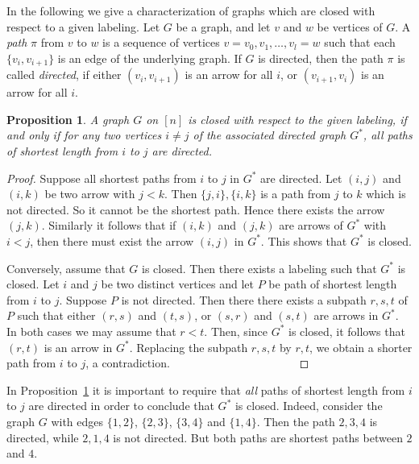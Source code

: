 \documentclass[11pt]{amsart}
\newtheorem{Proposition}[Theorem]{Proposition}
\begin{document}
In the following we give a characterization of graphs which are closed with respect to a given labeling. Let $G$ be a graph, and let $v$ and $w$ be vertices of $G$. A {\em path} $\pi$ from $v$ to $w$ is a sequence of vertices $v=v_0,v_1,\ldots,v_l=w$ such that each $\{v_i,v_{i+1}\}$ is an edge of the underlying graph. If $G$ is directed, then the path $\pi$ is called {\em directed}, if either $(v_i,v_{i+1})$ is an arrow for all $i$, or $(v_{i+1},v_i)$ is an arrow for all $i$.

\begin{Proposition}
\label{characterization}
A graph $G$  on $[n]$ is closed with respect to the given labeling, if and only if  for any two vertices $i\neq j$ of the associated directed graph $G^*$, all paths of shortest length  from $i$ to $j$ are directed.
\end{Proposition}

\begin{proof}
Suppose all shortest paths from $i$ to $j$ in $G^*$ are directed. Let $(i,j)$ and $(i,k)$ be two arrow with $j<k$.  Then $\{j,i\},\{i,k\}$ is a path from $j$ to $k$ which is not directed. So it cannot be the shortest path. Hence there exists the arrow $(j,k)$. Similarly it follows that if $(i,k)$  and $(j,k)$  are arrows of $G^*$ with $i<j$, then there must exist the arrow $(i,j)$ in $G^*$. This shows that $G^*$ is closed.

Conversely, assume that $G$ is closed.  Then there exists a labeling such that $G^*$ is closed. Let $i$ and $j$ be two distinct vertices and let $P$ be path of shortest length from $i$ to $j$. Suppose $P$ is not directed. Then there there exists a subpath $r,s,t$ of $P$  such that  either $(r,s)$ and  $(t,s)$,  or  $(s,r)$ and  $(s,t)$ are arrows in $G^*$. In both cases we may assume that $r<t$. Then, since $G^*$ is closed, it follows that $(r,t)$  is an arrow in $G^*$. Replacing the subpath $r,s,t$   by $r,t$,  we obtain a shorter path from $i$ to $j$, a contradiction.
\, \, \, \, \, \, \, \, \, \,
\, \, \, \, \, \, \, \, \, \,
\, \,
\end{proof}

In Proposition~\ref{characterization} it is important to  require that {\em all} paths of shortest length from $i$ to $j$ are directed in order to conclude that $G^*$ is closed. Indeed, consider the graph $G$ with edges  $\{1,2\}$, $\{2,3\}$, $\{3,4\}$ and $\{1,4\}$. Then the path $2,3,4$ is directed, while $2,1,4$ is not directed. But both paths are shortest paths between $2$ and $4$.
\end{document}
